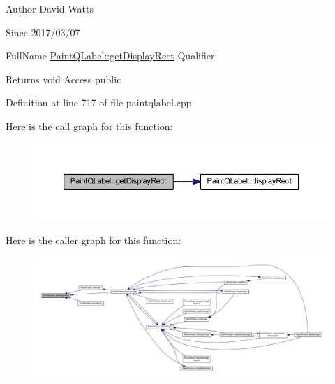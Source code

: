 \begin{DoxyAuthor}{Author}
David Watts 
\end{DoxyAuthor}
\begin{DoxySince}{Since}
2017/03/07
\end{DoxySince}
Full\+Name \hyperlink{class_paint_q_label_a58a4d1f0765a00967529fcbb9cecbc91}{Paint\+Q\+Label\+::get\+Display\+Rect} Qualifier \begin{DoxyReturn}{Returns}
void Access public 
\end{DoxyReturn}


Definition at line 717 of file paintqlabel.\+cpp.

Here is the call graph for this function\+:
\nopagebreak
\begin{figure}[H]
\begin{center}
\leavevmode
\includegraphics[width=350pt]{class_paint_q_label_a58a4d1f0765a00967529fcbb9cecbc91_cgraph}
\end{center}
\end{figure}
Here is the caller graph for this function\+:
\nopagebreak
\begin{figure}[H]
\begin{center}
\leavevmode
\includegraphics[width=350pt]{class_paint_q_label_a58a4d1f0765a00967529fcbb9cecbc91_icgraph}
\end{center}
\end{figure}
\mbox{\label{class_paint_q_label_a332bf0f6137c8613fbdeac4bd0c1516e}} 

